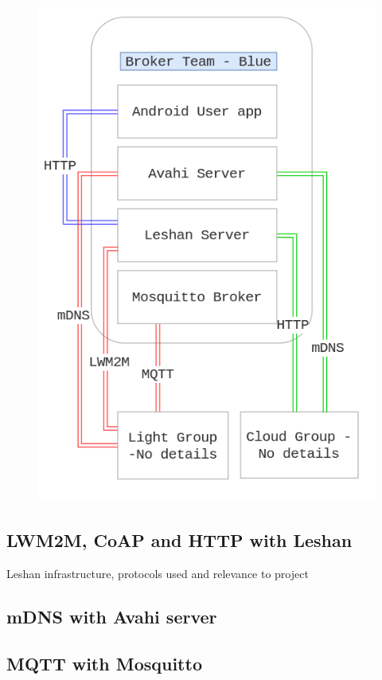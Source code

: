 \documentclass[conference]{IEEEtran}
\begin{document}
\begin{figure}[h]
	\begin{center}
		\includegraphics[width=1\linewidth]{img/overview}
		\caption{}
		\label{fig:fig1}
	\end{center}
\end{figure}
\subsection{LWM2M, CoAP and HTTP with Leshan}
Leshan infrastructure, protocols used and relevance to project

\subsection{mDNS with Avahi server}
\subsection{MQTT with Mosquitto}
\end{document}
